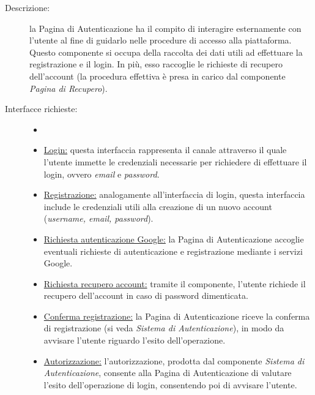 \documentclass[11pt, a4paper]{article}
\theoremstyle{definition} %
\begin{document}
\begin{description}
    \item[Descrizione:] la Pagina di Autenticazione ha il compito
    di interagire esternamente con l'utente al fine di guidarlo nelle
    procedure di accesso alla piattaforma. Questo componente si occupa della
    raccolta dei dati utili ad effettuare la registrazione e il
    login. In più, esso raccoglie le richieste di recupero dell'account
    (la procedura effettiva è presa in carico dal componente
    \textit{Pagina di Recupero}).

    \item[Interfacce richieste:]
    \begin{itemize}
        \item[]

        \item \underline{Login:} questa interfaccia rappresenta
        il canale attraverso il quale l'utente immette le credenziali
        necessarie per richiedere di effettuare il login, ovvero
        \textit{email} e \textit{password}.

        \item \underline{Registrazione:} analogamente all'interfaccia
        di login, questa interfaccia include le credenziali utili alla
        creazione di un nuovo account (\textit{username, email, password}).

        \item \underline{Richiesta autenticazione Google:} la Pagina di
        Autenticazione accoglie eventuali richieste di autenticazione e
        registrazione mediante i servizi Google.

        \item \underline{Richiesta recupero account:} tramite il componente,
        l'utente richiede il recupero dell'account in caso di password
        dimenticata.

        \item \underline{Conferma registrazione:} la Pagina di Autenticazione
        riceve la conferma di registrazione (si veda \textit{Sistema di
        Autenticazione}), in modo da avvisare l'utente riguardo l'esito
        dell'operazione.

        \item \underline{Autorizzazione:} l'autorizzazione, prodotta dal
        componente \textit{Sistema di Autenticazione}, consente alla
        Pagina di Autenticazione di valutare l'esito dell'operazione di
        login, consentendo poi di avvisare l'utente.
    \end{itemize}


\end{description}
\end{document}
